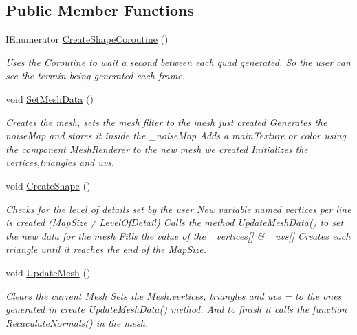 \subsection*{Public Member Functions}
\begin{DoxyCompactItemize}
\item 
I\+Enumerator \mbox{\hyperlink{class_assets_1_1_scripts_1_1_mesh_generation_a533ee7b8be835fa3b6f6282e86fd9ec6}{Create\+Shape\+Coroutine}} ()
\begin{DoxyCompactList}\small\item\em Uses the Coroutine to wait a second between each quad generated. So the user can see the terrain being generated each frame. \end{DoxyCompactList}\item 
void \mbox{\hyperlink{class_assets_1_1_scripts_1_1_mesh_generation_a132027f38358668e6f8c320b00ee9327}{Set\+Mesh\+Data}} ()
\begin{DoxyCompactList}\small\item\em Creates the mesh, sets the mesh filter to the mesh just created Generates the noise\+Map and stores it inside the \+\_\+noise\+Map Adds a main\+Texture or color using the component Mesh\+Renderer to the new mesh we created Initializes the vertices,triangles and uvs. \end{DoxyCompactList}\item 
void \mbox{\hyperlink{class_assets_1_1_scripts_1_1_mesh_generation_aebf4b5f0cb1285927d7c44a03e98d78c}{Create\+Shape}} ()
\begin{DoxyCompactList}\small\item\em Checks for the level of details set by the user New variable named vertices per line is created (Map\+Size / Level\+Of\+Detail) Calls the method \mbox{\hyperlink{class_assets_1_1_scripts_1_1_mesh_generation_abaeb22e0f390a218be5d9543138f52b9}{Update\+Mesh\+Data()}} to set the new data for the mesh Fills the value of the \+\_\+vertices\mbox{[}\mbox{]} \& \+\_\+uvs\mbox{[}\mbox{]} Creates each triangle until it reaches the end of the Map\+Size. \end{DoxyCompactList}\item 
void \mbox{\hyperlink{class_assets_1_1_scripts_1_1_mesh_generation_a41a4e7a75db511109f7837f1f0fa376b}{Update\+Mesh}} ()
\begin{DoxyCompactList}\small\item\em Clears the current Mesh Sets the Mesh.\+vertices, triangles and uvs = to the ones generated in create \mbox{\hyperlink{class_assets_1_1_scripts_1_1_mesh_generation_abaeb22e0f390a218be5d9543138f52b9}{Update\+Mesh\+Data()}} method. And to finish it calls the function Recaculate\+Normals() in the mesh. \end{DoxyCompactList}\item 

\end{DoxyCompactItemize}
